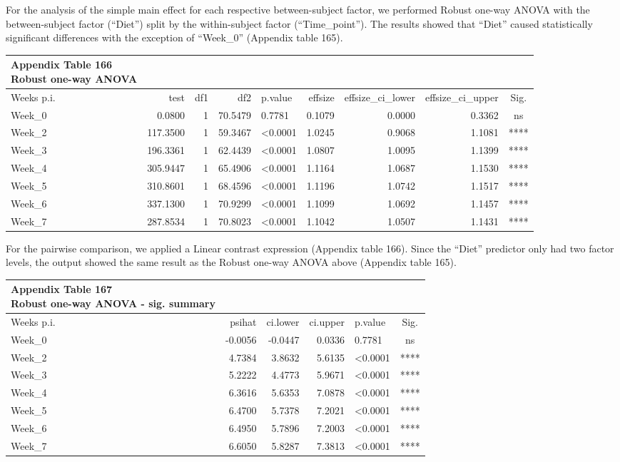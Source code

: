 \documentclass[
  12pt,
  letterpaper,
]{article}
\begin{document}
For the analysis of the simple main effect for each respective between-subject factor, we performed Robust one-way ANOVA with the between-subject factor (``Diet'') split by the within-subject factor (``Time\_point''). The results showed that ``Diet'' caused statistically significant differences with the exception of ``Week\_0'' (Appendix table 165).

\begingroup
\fontsize{12.0pt}{14.4pt}\selectfont
\begin{longtable}{l|rrrlrrrc}
\caption*{
{\large \textbf{Appendix Table 166}} \\ 
{\small \textbf{Robust one-way ANOVA}}
} \\ 
\toprule
Weeks p.i. & {test} & {df1} & {df2} & {p.value} & {effsize} & effsize\_ci\_lower & effsize\_ci\_upper & {Sig.} \\ 
\midrule\addlinespace[2.5pt]
Week\_0 & 0.0800 & 1 & 70.5479 & 0.7781 & 0.1079 & 0.0000 & 0.3362 & ns \\ 
Week\_2 & 117.3500 & 1 & 59.3467 & <0.0001 & 1.0245 & 0.9068 & 1.1081 & **** \\ 
Week\_3 & 196.3361 & 1 & 62.4439 & <0.0001 & 1.0807 & 1.0095 & 1.1399 & **** \\ 
Week\_4 & 305.9447 & 1 & 65.4906 & <0.0001 & 1.1164 & 1.0687 & 1.1530 & **** \\ 
Week\_5 & 310.8601 & 1 & 68.4596 & <0.0001 & 1.1196 & 1.0742 & 1.1517 & **** \\ 
Week\_6 & 337.1300 & 1 & 70.9299 & <0.0001 & 1.1099 & 1.0692 & 1.1457 & **** \\ 
Week\_7 & 287.8534 & 1 & 70.8023 & <0.0001 & 1.1042 & 1.0507 & 1.1431 & **** \\ 
\bottomrule
\end{longtable}
\endgroup

For the pairwise comparison, we applied a Linear contrast expression (Appendix table 166). Since the ``Diet'' predictor only had two factor levels, the output showed the same result as the Robust one-way ANOVA above (Appendix table 165).

\begingroup
\fontsize{12.0pt}{14.4pt}\selectfont
\begin{longtable}{l|rrrlc}
\caption*{
{\large \textbf{Appendix Table 167}} \\ 
{\small \textbf{Robust one-way ANOVA - sig. summary}}
} \\ 
\toprule
Weeks p.i. & {psihat} & {ci.lower} & {ci.upper} & {p.value} & {Sig.} \\ 
\midrule\addlinespace[2.5pt]
Week\_0 & -0.0056 & -0.0447 & 0.0336 & 0.7781 & ns \\ 
Week\_2 & 4.7384 & 3.8632 & 5.6135 & <0.0001 & **** \\ 
Week\_3 & 5.2222 & 4.4773 & 5.9671 & <0.0001 & **** \\ 
Week\_4 & 6.3616 & 5.6353 & 7.0878 & <0.0001 & **** \\ 
Week\_5 & 6.4700 & 5.7378 & 7.2021 & <0.0001 & **** \\ 
Week\_6 & 6.4950 & 5.7896 & 7.2003 & <0.0001 & **** \\ 
Week\_7 & 6.6050 & 5.8287 & 7.3813 & <0.0001 & **** \\ 
\bottomrule
\end{longtable}
\endgroup
\end{document}
